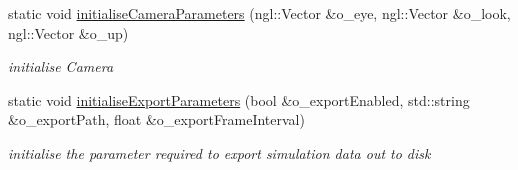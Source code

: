 \begin{DoxyCompactItemize}
static void \hyperlink{class_simulation_parameters_a95fed9bc4d0fec10543b5550f06e80ff}{initialiseCameraParameters} (ngl::Vector \&o\_\-eye, ngl::Vector \&o\_\-look, ngl::Vector \&o\_\-up)
\begin{DoxyCompactList}\small\item\em initialise Camera \item\end{DoxyCompactList}\item 
static void \hyperlink{class_simulation_parameters_a216667d44e3d5498187a54ea1aa05116}{initialiseExportParameters} (bool \&o\_\-exportEnabled, std::string \&o\_\-exportPath, float \&o\_\-exportFrameInterval)
\begin{DoxyCompactList}\small\item\em initialise the parameter required to export simulation data out to disk \item\end{DoxyCompactList}\end{DoxyCompactItemize}
